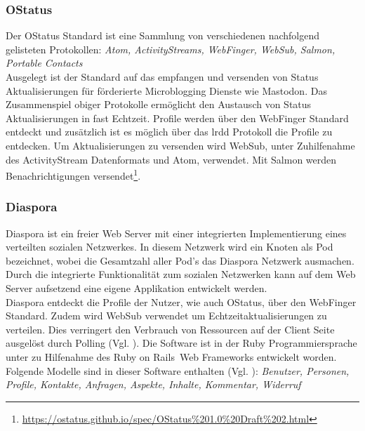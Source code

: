 	\subsubsection{OStatus}
	\label{sub:ostatus}
	Der OStatus Standard ist eine Sammlung von verschiedenen nachfolgend gelisteten Protokollen: \textit{Atom, ActivityStreams, WebFinger, WebSub, Salmon, Portable Contacts}\\
	
	Ausgelegt ist der Standard auf das empfangen und versenden von Status Aktualisierungen für förderierte Microblogging Dienste wie Mastodon. Das Zusammenspiel obiger Protokolle ermöglicht den Austausch von Status Aktualisierungen in fast Echtzeit. Profile werden über den WebFinger Standard entdeckt und zusätzlich ist es möglich über das \gls{lrdd} Protokoll die Profile zu entdecken. Um Aktualisierungen zu versenden wird WebSub, unter Zuhilfenahme des ActivityStream Datenformats und Atom, verwendet. Mit Salmon werden Benachrichtigungen versendet\footnote{\url{https://ostatus.github.io/spec/OStatus\%201.0\%20Draft\%202.html}}.
	
	\subsubsection{Diaspora}
	\label{sub:diaspora}
	Diaspora ist ein freier Web Server mit einer integrierten Implementierung eines verteilten sozialen Netzwerkes. In diesem Netzwerk wird ein Knoten als Pod bezeichnet, wobei die Gesamtzahl aller Pod's das Diaspora Netzwerk ausmachen. Durch die integrierte Funktionalität zum sozialen Netzwerken kann auf dem Web Server aufsetzend eine eigene Applikation entwickelt werden.\\ 
	
	Diaspora entdeckt die Profile der Nutzer, wie auch OStatus, über den WebFinger Standard. Zudem wird WebSub verwendet um Echtzeitaktualisierungen zu verteilen. Dies verringert den Verbrauch von Ressourcen auf der Client Seite ausgelöst durch Polling (Vgl. \cite{diaspora-about}). Die Software ist in der Ruby Programmiersprache unter zu Hilfenahme des \glqq Ruby on Rails\grqq~Web Frameworks entwickelt worden. Folgende Modelle sind in dieser Software enthalten (Vgl. \cite{diaspora-introduction}):
	\textit{Benutzer, Personen, Profile, Kontakte, Anfragen, Aspekte, Inhalte, Kommentar, Widerruf}
	
